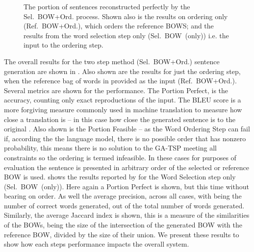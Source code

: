 \documentclass[compsoc]{IEEEtran}
\theoremstyle{plain}
\theoremstyle{definition}
\newcommand{\oracletitle}{Ref.~BOW+Ord.}
\newcommand{\selectiontitle}{Sel.~BOW~(only)}
\newcommand{\twosteptitle}{Sel.~BOW+Ord.}
\begin{document}
\begin{figure}
	\centering
	 {\ordlenscoresoracle}
	\caption{The portion of sentences reconstructed perfectly by the \twosteptitle{} process. Shown also is the results on ordering only (\oracletitle{}), which orders the reference BOWS; and the results from the word selection step only (\selectiontitle{}) i.e. the input to the ordering step.}
	\label{figure:exactlenscore}
\end{figure}




The overall results for the two step method (\twosteptitle{}) sentence generation are shown in . Also shown are the results for just the ordering step, when the reference bag of words in provided as the input (\oracletitle{}). Several metrics are shown for the performance. The Portion Perfect, is the accuracy, counting only exact reproductions of the input. The BLEU score is a more forgiving measure commonly used in machine translation to measure how close a translation is -- in this case how close the generated sentence is to the original \cite{Papineni2002}. Also shown is the Portion Feasible -- as the Word Ordering Step can fail if, according the the language model, there is no possible order that has nonzero probability, this means there is no solution to the GA-TSP meeting all constraints so the ordering is termed infeasible. In these cases for purposes of evaluation the sentence is presented in arbitrary order of the selected or reference BOW is used.
 shows the results reported by \cite{White2015BOWgen} for the Word Selection step only (\selectiontitle{}). Here again a Portion Perfect is shown, but this time without bearing on order. As well the average precision, across all cases, with being the number of correct words generated, out of the total number of words generated. Similarly, the average Jaccard index is shown, this is a measure of the similarities of the BOWs, being the size of the intersection of the generated BOW with the reference BOW, divided by the size of their union. We present these results to show how each steps performance impacts the overall system.
\end{document}
